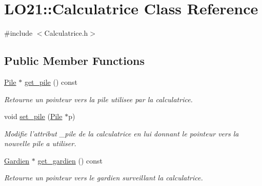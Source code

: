 \hypertarget{class_l_o21_1_1_calculatrice}{\section{\-L\-O21\-:\-:\-Calculatrice \-Class \-Reference}
\label{class_l_o21_1_1_calculatrice}
}


{\ttfamily \#include $<$\-Calculatrice.\-h$>$}

\subsection*{\-Public \-Member \-Functions}
\begin{DoxyCompactItemize}
\item 
\hyperlink{class_l_o21_1_1_pile}{\-Pile} $\ast$ \hyperlink{class_l_o21_1_1_calculatrice_ae5c36b1f514aa5a96ec6e1ace304ab29}{get\-\_\-pile} () const 
\begin{DoxyCompactList}\small\item\em \-Retourne un pointeur vers la pile utilisee par la calculatrice. \end{DoxyCompactList}\item 
void \hyperlink{class_l_o21_1_1_calculatrice_aed7f35595b674041e659b45cf6eff68d}{set\-\_\-pile} (\hyperlink{class_l_o21_1_1_pile}{\-Pile} $\ast$p)
\begin{DoxyCompactList}\small\item\em \-Modifie l'attribut \-\_\-pile de la calculatrice en lui donnant le pointeur vers la nouvelle pile a utiliser. \end{DoxyCompactList}\item 
\hyperlink{class_l_o21_1_1_gardien}{\-Gardien} $\ast$ \hyperlink{class_l_o21_1_1_calculatrice_a4884e6d8c85b8b9fe9eed0fa96242538}{get\-\_\-gardien} () const 
\begin{DoxyCompactList}\small\item\em \-Retourne un pointeur vers le gardien surveillant la calculatrice. \end{DoxyCompactList}\end{DoxyCompactItemize}
